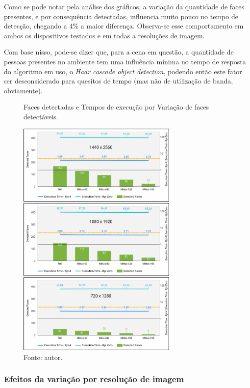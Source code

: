 Como se pode notar pela análise dos gráficos, a variação da quantidade de faces presentes, e por consequência detectadas, influencia muito pouco no tempo de detecção, chegando a 4\% a maior diferença. Observa-se esse comportamento em ambos os dispositivos testados e em todas a resoluções de imagem.

Com base nisso, pode-se dizer que, para a cena em questão, a quantidade de pessoas presentes no ambiente tem uma influência mínima no tempo de resposta do algoritmo em uso, o \textit{Haar cascade object detection}, podendo então este fator ser desconsiderado para quesitos de tempo (mas não de utilização de banda, obviamente).

\begin{figure}[H]
    \centering
    \caption[Faces detectadas e Tempos de execução por Variação de faces detectáveis.]{Faces detectadas e Tempos de execução por Variação de faces detectáveis.}
    \includegraphics[width=0.7\textwidth]{Cap4_Experimentos_Realizados/Figures/cena1_graficos_variacao_faces.jpg}
    \caption*{Fonte: autor.}
    \label{fig:dadosCena1_graficos_variacao_faces}
\end{figure}

\subsubsection{Efeitos da variação por resolução de imagem}

